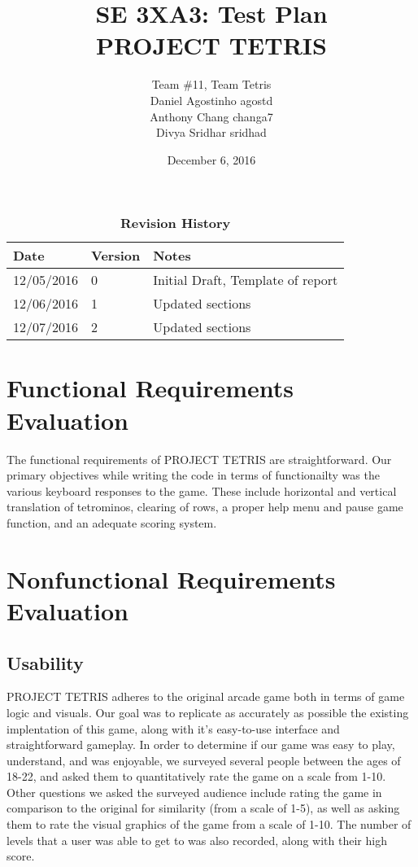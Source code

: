 \documentclass[12pt, titlepage]{article}
\title{SE 3XA3: Test Plan\\PROJECT TETRIS}
\author{Team \#11, Team Tetris
		\\ Daniel Agostinho agostd
		\\ Anthony Chang changa7
		\\ Divya Sridhar sridhad
}
\date{December 6, 2016}
\begin{document}
\maketitle
{}
\tableofcontents
\listoftables
\listoffigures

\begin{table}[bp]
\caption{\bf Revision History}
\begin{tabularx}{\textwidth}{p{3cm}p{2cm}X}
\toprule {\bf Date} & {\bf Version} & {\bf Notes}\\
\midrule
12/05/2016 & 0 & Initial Draft, Template of report\\
12/06/2016 & 1 & Updated sections\\
12/07/2016 & 2 & Updated sections\\
\bottomrule
\end{tabularx}
\end{table}
\newpage
{}
\section{Functional Requirements Evaluation}
The functional requirements of PROJECT TETRIS are straightforward. Our primary objectives while writing the code in terms of functionailty was the various keyboard responses to the game. These include horizontal and vertical translation of tetrominos, clearing of rows, a proper help menu and pause game function, and an adequate scoring system.
\section{Nonfunctional Requirements Evaluation}
\subsection{Usability}
PROJECT TETRIS adheres to the original arcade game both in terms of game logic and visuals. Our goal was to replicate as accurately as possible the existing implentation of this game, along with it's easy-to-use interface and straightforward gameplay. In order to determine if our game was easy to play, understand, and was enjoyable, we surveyed several people between the ages of 18-22, and asked them to quantitatively rate the game on a scale from 1-10. Other questions we asked the surveyed audience include rating the game in comparison to the original for similarity (from a scale of 1-5), as well as asking them to rate the visual graphics of the game from a scale of 1-10. The number of levels that a user was able to get to was also recorded, along with their high score. 
\end{document}
